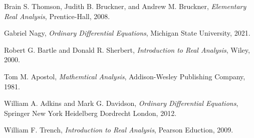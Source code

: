\documentclass{arabicClass}
\begin{document}
	\abovedisplayskip=7pt
	\belowdisplayskip=7pt
	
	
	\amiri
	
	
	
	\arabicfont
	\tableofcontents
	\clearpage
	
	
	
	
		
	
	
	\begin{thebibliography}{99}

	
	\begin{english}
		Brain S. Thomson, Judith B. Bruckner, and Andrew M. Bruckner, \emph{Elementary Real Analysis}, Prentice-Hall, 2008.
		
		Gabriel Nagy, \emph{Ordinary Differential Equations}, Michigan State University, 2021.

        Robert G. Bartle and Donald R. Sherbert, \emph{Introduction to Real Analysis}, Wiley, 2000.		
		
		Tom M. Apostol, \emph{Mathemtical Analysis}, Addison-Wesley Publishing Company, 1981.
		
		William A. Adkins and Mark G. Davidson, \emph{Ordinary Differential Equations}, Springer New York Heidelberg Dordrecht London, 2012.
		
		William F. Trench, \emph{Introduction to Real Analysis}, Pearson Eduction, 2009.
		
		
		
			\end{english}
	\end{thebibliography}
\end{document}
